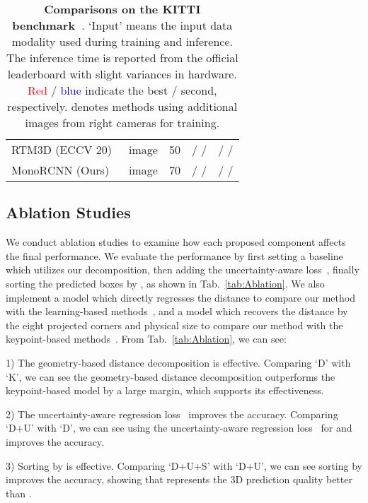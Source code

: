 \documentclass[10pt,twocolumn,letterpaper]{article}
\begin{document}
\begin{table*}
\begin{center}
\begin{adjustbox}{max width=\textwidth}
\begin{tabular}{l | c | c | c c }
RTM3D (ECCV 20)~\cite{DBLP:conf/eccv/LiZLC20}  & image & 50 &  /  /  	&  / /  \\ 
MonoRCNN (Ours) & image & 70 &  /  /   &  / /    \\ 
\bottomrule[1pt]
\end{tabular}
\end{adjustbox}
\end{center}
\caption{
\textbf{Comparisons on the KITTI benchmark~\cite{DBLP:conf/cvpr/GeigerLU12}}. `Input' means the input data modality used during training and inference. The inference time is reported from the official leaderboard with slight variances in hardware. \textcolor{red}{Red} / \textcolor{blue}{blue} indicate the best / second, respectively.  denotes methods using additional images from right cameras for training.}
\label{tab:Test}
\end{table*}

\subsection{Ablation Studies}
We conduct ablation studies to examine how each proposed component affects the final performance. We evaluate the performance by first setting a baseline which utilizes our decomposition, then adding the uncertainty-aware loss~\cite{DBLP:conf/cvpr/KendallGC18}, finally sorting the predicted boxes by , as shown in Tab.~\ref{tab:Ablation}. We also implement a model which directly regresses the distance to compare our method with the learning-based methods~\cite{DBLP:journals/corr/abs-1904-07850,DBLP:conf/cvpr/ChenTSL20,DBLP:conf/iccv/SimonelliBPLK19,DBLP:conf/eccv/SimonelliBPRK20}, and a model which recovers the distance by the eight projected corners and physical size to compare our method with the keypoint-based methods~\cite{DBLP:journals/corr/abs-1906-08070,DBLP:conf/eccv/LiZLC20}. From Tab.~\ref{tab:Ablation}, we can see:

1) The geometry-based distance decomposition is effective. Comparing `D' with `K', we can see the geometry-based distance decomposition outperforms the keypoint-based model by a large margin, which supports its effectiveness.

2) The uncertainty-aware regression loss~\cite{DBLP:conf/cvpr/KendallGC18} improves the accuracy. Comparing `D+U' with `D', we can see using the uncertainty-aware regression loss~\cite{DBLP:conf/cvpr/KendallGC18} for  and  improves the accuracy.

3) Sorting by  is effective. Comparing `D+U+S' with `D+U', we can see sorting by  improves the accuracy, showing that  represents the 3D prediction quality better than .
\end{document}
